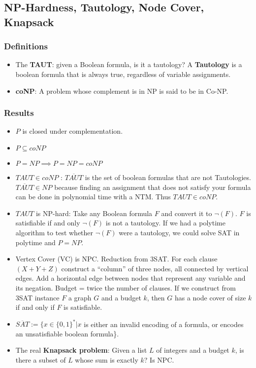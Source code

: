 \subsection{\color{ForestGreen}NP-Hardness, Tautology, Node Cover, Knapsack}
\subsubsection{Definitions}
\begin{itemize}
    \item The \textbf{TAUT}: given a Boolean formula, is it a tautology? A \textbf{Tautology} is a boolean formula that is always true, regardless of variable assignments.
    \item \textbf{coNP}: A problem whose complement is in NP is said to be in Co-NP.
\end{itemize}

\subsubsection{Results} 
\begin{itemize}
    \item $P$ is closed under complementation. 
    \item $P\subseteq coNP$
    \item $P=NP\implies P=NP=coNP$
    \item $TAUT\in coNP$ : $\overline{TAUT}$ is the set of boolean formulas that are not Tautologies. $\overline{TAUT} \in NP$ because finding an assignment that does not satisfy your formula can be done in polynomial time with a NTM. Thus $TAUT\in coNP.$
    \item $TAUT$ is NP-hard: Take any Boolean formula $F$ and convert it to $\neg (F)$. $F$ is satisfiable if and only $\neg(F)$ is not a tautology. If we had a polytime algorithm to test whether $\neg(F)$ were a tautology, we could solve SAT in polytime and $P=NP.$
    \item Vertex Cover (VC) is NPC. Reduction from 3SAT. For each clause $(X+Y+Z)$ construct a “column” of three nodes, all connected by vertical edges. Add a horizontal edge between nodes that represent any variable and its negation. Budget = twice the number of clauses. If we construct from 3SAT instance $F$ a graph $G$ and a budget $k$, then $G$ has a node cover of size $k$ if and only if $F$ is satisfiable.
    \item $\overline{SAT}:= \{x \in \{0, 1\}^* | x$ is either an invalid encoding of a formula, or encodes an unsatisfiable boolean formula\}.  
    \item The real \textbf{Knapsack problem}: Given a list $L$ of integers and a budget $k$, is there a subset of $L$ whose sum is exactly $k$? Is NPC.


\end{itemize}
